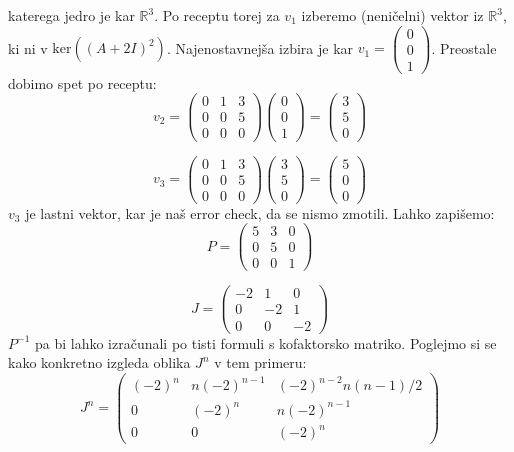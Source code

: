 \documentclass{article}
\begin{document}
katerega jedro je kar $\mathbb{R}^3$.
Po receptu torej za $v_1$ izberemo (neničelni) vektor iz $\mathbb{R}^3$, ki ni v $\mathrm{ker}((A+2I)^2)$. Najenostavnejša izbira je kar $v_1 = \begin{pmatrix} 0 \\ 0 \\ 1 \end{pmatrix}$.
Preostale dobimo spet po receptu:
\begin{equation*}
v_2 = 
\begin{pmatrix}
0 & 1 & 3 \\
0 & 0 & 5 \\
0 & 0 & 0
\end{pmatrix}
\begin{pmatrix} 0 \\ 0 \\ 1
\end{pmatrix} =
\begin{pmatrix} 3 \\ 5 \\ 0 \end{pmatrix}
\end{equation*}

\begin{equation*}
v_3 = 
\begin{pmatrix}
0 & 1 & 3 \\
0 & 0 & 5 \\
0 & 0 & 0
\end{pmatrix}
\begin{pmatrix} 3 \\ 5 \\ 0
\end{pmatrix} =
\begin{pmatrix} 5 \\ 0 \\ 0 \end{pmatrix}
\end{equation*}
$v_3$ je lastni vektor, kar je naš error check, da se nismo zmotili.
Lahko zapišemo:
\begin{equation*}
P = 
\begin{pmatrix}
5 & 3 & 0 \\
0 & 5 & 0 \\
0 & 0 & 1
\end{pmatrix}
\end{equation*}

\begin{equation*}
J = 
\begin{pmatrix}
-2 & 1 & 0 \\
0 & -2 & 1 \\
0 & 0 & -2
\end{pmatrix}
\end{equation*}
$P^{-1}$ pa bi lahko izračunali po tisti formuli s kofaktorsko matriko.
Poglejmo si se kako konkretno izgleda oblika $J^n$ v tem primeru:
\begin{equation*}
J^n = 
\begin{pmatrix}
(-2)^n & n (-2)^{n-1} & (-2)^{n-2} n(n-1)/2 \\
0 & (-2)^n & n (-2)^{n-1} \\
0 & 0 & (-2)^n
\end{pmatrix}
\end{equation*}
\end{document}
